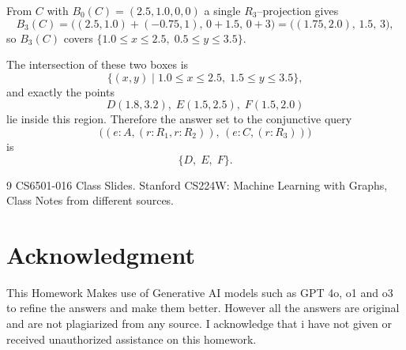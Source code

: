 \documentclass[a4paper,12pt]{article}
\begin{document}
From \(C\) with \(B_0(C)=(2.5,1.0,0,0)\) a single \(R_3\)–projection gives
\[
B_3(C)=\bigl((2.5,1.0)+(-0.75,1),\,0+1.5,\,0+3\bigr)
      =\bigl((1.75,2.0),\,1.5,\,3\bigr),
\]
so \(B_3(C)\) covers 
\(\{1.0\le x\le2.5,\;0.5\le y\le3.5\}.\)

The intersection of these two boxes is 
\[
\{(x,y)\mid 1.0\le x\le2.5,\;1.5\le y\le3.5\},
\]
and exactly the points 
\[
D(1.8,3.2),\;E(1.5,2.5),\;F(1.5,2.0)
\]
lie inside this region.  Therefore the answer set to the conjunctive query
\[
\bigl((e:A,(r:R_1,r:R_2)),\,(e:C,(r:R_3))\bigr)
\]
is
\[
\{D,\;E,\;F\}.
\]




\begin{thebibliography}{9}
  CS6501-016 Class Slides.
      Stanford CS224W: Machine Learning with Graphs, Class Notes from different sources.
\end{thebibliography}





\section*{Acknowledgment}
This Homework Makes use of Generative AI models such as GPT 4o, o1 and o3 to refine the answers and make them better. However all the answers are original and are not plagiarized from any source. I acknowledge that i have not given or received unauthorized assistance on this homework.
\end{document}
